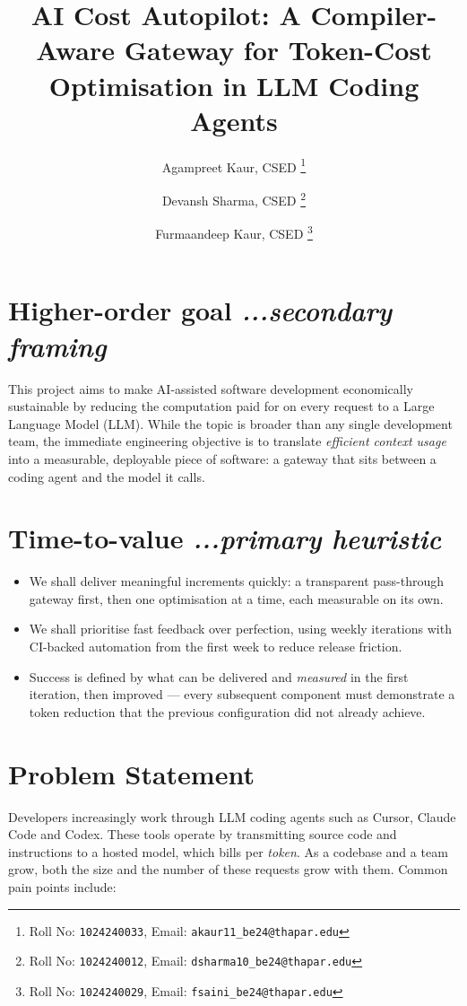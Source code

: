 \documentclass[11pt,a4paper]{article}
\title{AI Cost Autopilot: A Compiler-Aware Gateway for
  Token-Cost Optimisation in LLM Coding Agents}
\author{
  Agampreet Kaur, CSED%
  \thanks{Roll No: \texttt{1024240033}, %
    Email: \texttt{akaur11\_be24@thapar.edu}}
  \and
  Devansh Sharma, CSED%
  \thanks{Roll No: \texttt{1024240012}, %
    Email: \texttt{dsharma10\_be24@thapar.edu}}
  \and
  Furmaandeep Kaur, CSED%
  \thanks{Roll No: \texttt{1024240029}, %
    Email: \texttt{fsaini\_be24@thapar.edu}}
}
\newcommand{\BvrHint}[1]{%
  {\normalfont\normalsize\itshape\hfill #1}}
\begin{document}
\maketitle

\section{Higher-order goal \BvrHint{...secondary framing}}

This project aims to make AI-assisted software development economically
sustainable by reducing the computation paid for on every request to a Large
Language Model (LLM). While the topic is broader than any single development
team, the immediate engineering objective is to translate \emph{efficient
context usage} into a measurable, deployable piece of software: a gateway that
sits between a coding agent and the model it calls.

\section{Time-to-value \BvrHint{...primary heuristic}}

\begin{itemize}[noitemsep]
  \item We shall deliver meaningful increments quickly: a transparent
        pass-through gateway first, then one optimisation at a time, each
        measurable on its own.
  \item We shall prioritise fast feedback over perfection, using weekly
        iterations with CI-backed automation from the first week to reduce
        release friction.
  \item Success is defined by what can be delivered and \emph{measured} in the
        first iteration, then improved --- every subsequent component must
        demonstrate a token reduction that the previous configuration did not
        already achieve.
\end{itemize}

\section{Problem Statement}

Developers increasingly work through LLM coding agents such as Cursor, Claude
Code and Codex. These tools operate by transmitting source code and
instructions to a hosted model, which bills per \emph{token}. As a codebase and
a team grow, both the size and the number of these requests grow with them.
Common pain points include:
\end{document}
